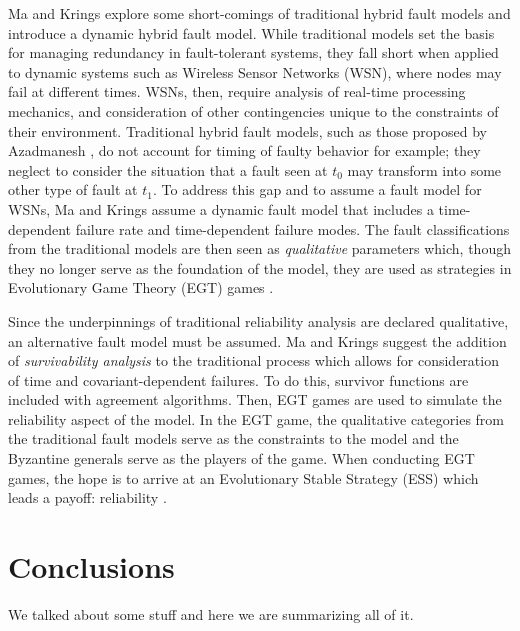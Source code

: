 \documentclass[twoside, conference]{IEEEtran}
\begin{document}
Ma and Krings \cite{Ma2008} explore some short-comings of traditional hybrid fault models and introduce a dynamic hybrid fault model. While traditional models set the basis for managing redundancy in fault-tolerant systems, they fall short when applied to dynamic systems such as Wireless Sensor Networks (WSN), where nodes may fail at different times. WSNs, then, require analysis of real-time processing mechanics, and consideration of other contingencies unique to the constraints of their environment. Traditional hybrid fault models, such as those proposed by Azadmanesh \cite{Azadmanesh2000}, do not account for timing of faulty behavior for example; they neglect to consider the situation that a fault seen at $t_0$ may transform into some other type of fault at $t_1$. To address this gap and to assume a fault model for WSNs, Ma and Krings assume a dynamic fault model that includes a time-dependent failure rate and time-dependent failure modes. The fault classifications from the traditional models are then seen as \textit{qualitative} parameters which, though they no longer serve as the foundation of the model, they are used as strategies in Evolutionary Game Theory (EGT) games \cite{Ma2008}.

Since the underpinnings of traditional reliability analysis are declared qualitative, an alternative fault model must be assumed. Ma and Krings suggest the addition of \textit{survivability analysis} to the traditional process which allows for consideration of time and covariant-dependent failures. To do this, survivor functions are included with agreement algorithms. Then, EGT games are used to simulate the reliability aspect of the model. In the EGT game, the qualitative categories from the traditional fault models serve as the constraints to the model and the Byzantine generals serve as the players of the game. When conducting EGT games, the hope is to arrive at an Evolutionary Stable Strategy (ESS) which leads a payoff: reliability \cite{Ma2008}.

\section{Conclusions}\label{sec:conclusions}
We talked about some stuff and here we are summarizing all of it.



\end{document}

